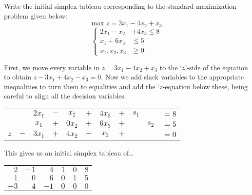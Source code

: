 \documentclass[11pt,letterpaper]{article}
\begin{document}
\newpage



 Write the initial simplex tableau corresponding to the standard maximization problem given below: 
	\[
	\text{max } z= 3x_1 - 4x_2 + x_3
	\]
	\[
	\left\{
	\begin{aligned}
	2x_1 - x_2 &+ 4x_3\leq 8 \\
	x_1 + 6x_3&\leq 5 \\
	x_1, x_2, x_3&\geq 0
	\end{aligned} \right.
	\] \pspace

\sol First, we move every variable in $z= 3x_1 - 4x_2 + x_3$ to the `$z$'-side of the equation to obtain $z - 3x_1 + 4x_2 - x_3= 0$. Now we add slack variables to the appropriate inequalities to turn them to equalities and add the `$z$-equation below these, being careful to align all the decision variables: \pspace
	\begin{table}[!ht]
	\centering
	\begin{tabular}{ccccccccccc}
		&	 & $2x_1$ & $-$ & $x_2$ & $+$ & $4x_3$ & $+$ & $s_1$ & & $= 8$ \\	
		&	 & $x_1$ & $+$ & $0x_2$ & $+$ & $6x_3$ & $+$ & & $s_2$ & $= 5$ \\	
	$z$   & $-$ & $3x_1$ & $+$ & $4x_2$ & $-$ & $x_3$ & $+$ & & & $= 0$ 
	\end{tabular}
	\end{table} \pspace
This gives us an initial simplex tableau of\dots \pspace
	 \begin{table}[!ht]
	\centering
	\begin{tabular}{rrrrr|r}
	$2$ & $-1$ & $4$ & $1$ & $0$ & $8$ \\
	$1$ & $0$ & $6$ & $0$ & $1$ & $5$ \\ \hline
	$-3$ & $4$ & $-1$ & $0$ & $0$ & $0$ \\
	\end{tabular}
	\end{table}



\newpage
\end{document}
